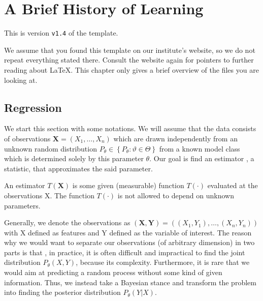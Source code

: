\newcommand{\package}{\emph}

\chapter{A Brief History of Learning}

This is version \verb-v1.4- of the template.

We assume that you found this template on our institute's website, so
we do not repeat everything stated there.  Consult the website again
for pointers to further reading about \LaTeX{}.  This chapter only
gives a brief overview of the files you are looking at.




\section{Regression}
We start this section with some notations. We will assume that the data
consists of observations $\mathbf{X}=\left(X_{1}, \ldots, X_{n}\right)$ which are drawn independently from an unknown random distribution  $P_{\theta} \in\left\{P_{\theta}: \vartheta \in \Theta\right\}$ from a known model class which is determined solely by this parameter $\theta$.
Our goal is find an estimator , a statistic, that approximates the said parameter.

\begin{definition}
An estimator $T(\mathbf{X})$ is some given (measurable) function $T(\cdot)$ evaluated at the observations X. The function $T(\cdot)$ is not allowed to depend on unknown parameters.
\end{definition}
Generally, we denote the observations as $(\mathbf{X},\mathbf{Y})=\left((X_{1},Y_{1}), \ldots, (X_{n},Y_{n})\right)$ with X defined as features and Y defined as the variable of interest. The reason why we would want to separate our observations (of arbitrary dimension) in two parts is that , in practice, it is often difficult and impractical to find the joint
distribution $P_{\theta}(X,Y)$, because its complexity. Furthermore, it is rare that we would aim at predicting a random process without some kind of given information. Thus, we instead take a Bayesian stance and transform the problem into finding the posterior distribution $P_{\theta}(Y|X)$. 
\\
\\
\\
\\

